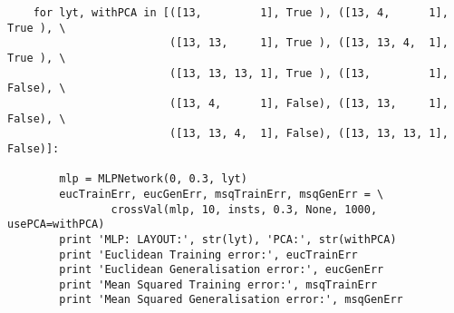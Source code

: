 \documentclass{article}
\begin{document}
\begin{verbatim}
    for lyt, withPCA in [([13,         1], True ), ([13, 4,      1], True ), \
                         ([13, 13,     1], True ), ([13, 13, 4,  1], True ), \
                         ([13, 13, 13, 1], True ), ([13,         1], False), \
                         ([13, 4,      1], False), ([13, 13,     1], False), \
                         ([13, 13, 4,  1], False), ([13, 13, 13, 1], False)]:

        mlp = MLPNetwork(0, 0.3, lyt)
        eucTrainErr, eucGenErr, msqTrainErr, msqGenErr = \
                crossVal(mlp, 10, insts, 0.3, None, 1000, usePCA=withPCA)
        print 'MLP: LAYOUT:', str(lyt), 'PCA:', str(withPCA)
        print 'Euclidean Training error:', eucTrainErr
        print 'Euclidean Generalisation error:', eucGenErr
        print 'Mean Squared Training error:', msqTrainErr
        print 'Mean Squared Generalisation error:', msqGenErr

\end{verbatim}
\end{document}
